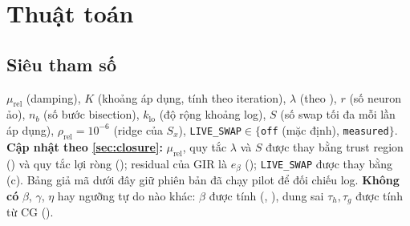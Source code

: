 \section{Thuật toán}\label{sec:algorithm}

\subsection{Siêu tham số}

$\mu_{\mathrm{rel}}$ (damping), $K$ (khoảng áp dụng, tính theo iteration), $\lambda$ (theo ), $r$ (số neuron ảo), $n_b$ (số bước bisection), $k_{\mathrm{lo}}$ (độ rộng khoảng log), $S$ (số swap tối đa mỗi lần áp dụng), $\rho_{\mathrm{rel}}=10^{-6}$ (ridge của $S_x$), \texttt{LIVE\_SWAP}$\in\{$\texttt{off} (mặc định), \texttt{measured}$\}$. \textbf{Cập nhật theo \cref{sec:closure}:} $\mu_{\mathrm{rel}}$, quy tắc $\lambda$ và $S$ được thay bằng trust region () và quy tắc lợi ròng (); residual của GIR là $e_\beta$ (); \texttt{LIVE\_SWAP} được thay bằng (c). Bảng giả mã dưới đây giữ phiên bản đã chạy pilot để đối chiếu log. \textbf{Không có} $\beta$, $\gamma$, $\eta$ hay ngưỡng tự do nào khác: $\beta$ được tính (, ), dung sai $\tau_h,\tau_g$ được tính từ CG ().

